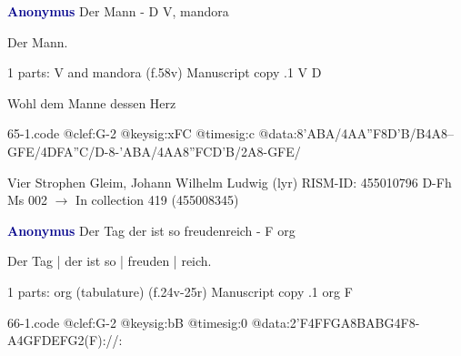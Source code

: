 \documentclass[twocolumn]{book}
\begin{document}
\newline \par \vspace{7pt} \textcolor{darkblue}{\textbf{Anonymus  }}
\newline Der Mann - D
\newline V, mandora
\newline \begin{itshape}[heading, f.58v:] Der Mann.\end{itshape} 
\newline \textcolor{darkblue}{}  1 parts: V and mandora  (f.58v)
\newline Manuscript copy
.1  V  D
\newline \begin{footnotesize} Wohl dem Manne dessen Herz \end{footnotesize}  
\begin{filecontents*}{65-1.code}
@clef:G-2
@keysig:xFC
@timesig:c
@data:8'ABA/4AA''F8D'B/B4A8--GFE/4DFA''C/D-8-'ABA/4AA{8''FC}{D'B}/2A8-GFE/
\end{filecontents*}
\newline
%

\newline Vier Strophen
\newline Gleim, Johann Wilhelm Ludwig  (lyr)
\newline RISM-ID: 455010796
\newline D-Fh  Ms 002
\newline $\rightarrow$ In collection 419 (455008345)
      
\newline \par \vspace{7pt} \textcolor{darkblue}{\textbf{Anonymus  }}
\newline Der Tag der ist so freudenreich - F
\newline org
\newline \begin{itshape}[f.25r, at left:] Der Tag | der ist so | freuden | reich.\end{itshape} 
\newline \textcolor{darkblue}{}  1 parts: org (tabulature)  (f.24v-25r)
\newline Manuscript copy
.1  org  F  
\begin{filecontents*}{66-1.code}
@clef:G-2
@keysig:bB
@timesig:0
@data:2'F4FFGA{8BABG}4F8-A4GFDEFG2(F)://:
\end{filecontents*}
\newline
%
\end{document}
